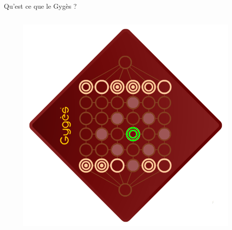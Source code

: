 \documentclass{beamer}
\begin{document}
\begin{frame}{Qu’est ce que le Gygès ?}
\begin{columns}
{{						\only<4> {
							\begin{figure}[h!]
								\centering
								\includegraphics[width=\textwidth]{images/move2.png}
							\end{figure}
						}

}}
\end{columns}
\end{frame}
\end{document}
